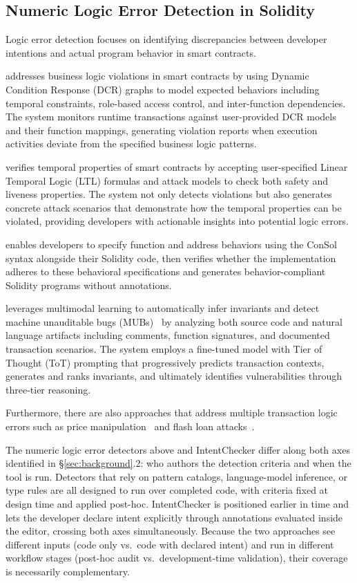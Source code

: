 \documentclass[pdflatex,sn-basic]{sn-jnl}%
\theoremstyle{thmstyleone}%
\theoremstyle{thmstyletwo}%
\theoremstyle{thmstylethree}%
\begin{document}
\subsection{Numeric Logic Error Detection in Solidity}
Logic error detection focuses on identifying discrepancies between developer intentions and actual program behavior in smart contracts.

\citep{highguard} addresses business logic violations in smart contracts by using Dynamic Condition Response (DCR) graphs
to model expected behaviors including temporal constraints, role-based access control, and inter-function dependencies.
The system monitors runtime transactions against user-provided DCR models and their function mappings,
generating violation reports when execution activities deviate from the specified business logic patterns.

\citep{smartpulse} verifies temporal properties of smart contracts by accepting user-specified Linear Temporal Logic (LTL) formulas
and attack models to check both safety and liveness properties.
The system not only detects violations but also generates concrete attack scenarios that demonstrate how the temporal properties can be violated,
providing developers with actionable insights into potential logic errors.

\citep{consolidating} enables developers to specify function and address behaviors using the ConSol syntax alongside their Solidity code,
then verifies whether the implementation adheres to these behavioral specifications and generates behavior-compliant Solidity programs without annotations.

\citep{smartinv} leverages multimodal learning to automatically infer invariants and detect machine unauditable bugs (MUBs)~\citep{exploitablebugs}
by analyzing both source code and natural language artifacts including comments, function signatures, and documented transaction scenarios.
The system employs a fine-tuned model with Tier of Thought (ToT) prompting that progressively predicts transaction contexts,
generates and ranks invariants, and ultimately identifies vulnerabilities through three-tier reasoning.

Furthermore, there are also approaches that address multiple transaction logic errors such as price manipulation~\citep{defiranger,defiguard,pomabuster,secplf,defitainter}
and flash loan attacks~\citep{defitail,midnight}.

The numeric logic error detectors above and IntentChecker differ along both axes identified in §\ref{sec:background}.2: who authors the detection criteria and when the tool is run.
Detectors that rely on pattern catalogs, language-model inference, or type rules are all designed to run over completed code, with criteria fixed at design time and applied post-hoc.
IntentChecker is positioned earlier in time and lets the developer declare intent explicitly through annotations evaluated inside the editor, crossing both axes simultaneously.
Because the two approaches see different inputs (code only vs.\ code with declared intent) and run in different workflow stages (post-hoc audit vs.\ development-time validation), their coverage is necessarily complementary.
\end{document}
